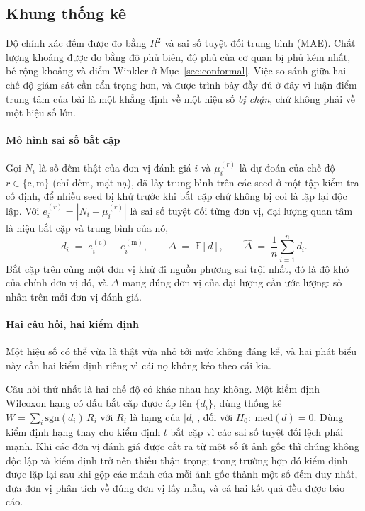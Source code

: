 \documentclass[preprint,12pt]{elsarticle}
\begin{document}
\subsection{Khung thống kê}\label{sec:stats}

Độ chính xác đếm được đo bằng $R^2$ và sai số tuyệt đối trung bình (MAE). Chất lượng khoảng được đo bằng độ phủ
biên, độ phủ của cơ quan bị phủ kém nhất, bề rộng khoảng và điểm Winkler ở Mục~\ref{sec:conformal}. Việc so sánh
giữa hai chế độ giám sát cần cẩn trọng hơn, và được trình bày đầy đủ ở đây vì luận điểm trung tâm của bài là một
khẳng định về một hiệu số \emph{bị chặn}, chứ không phải về một hiệu số lớn.

\paragraph{Mô hình sai số bắt cặp} Gọi $N_i$ là số đếm thật của đơn vị đánh giá $i$ và $\mu_i^{(r)}$ là dự đoán
của chế độ $r \in \{\mathrm{c},\mathrm{m}\}$ (chỉ-đếm, mặt nạ), đã lấy trung bình trên các seed ở một tập kiểm tra
cố định, để nhiễu seed bị khử trước khi bắt cặp chứ không bị coi là lặp lại độc lập. Với
$e_i^{(r)} = |N_i - \mu_i^{(r)}|$ là sai số tuyệt đối từng đơn vị, đại lượng quan tâm là hiệu bắt cặp và trung
bình của nó,
\begin{equation}
d_i \;=\; e_i^{(\mathrm{c})} - e_i^{(\mathrm{m})}, \qquad
\Delta \;=\; \mathbb{E}[d], \qquad
\hat{\Delta} \;=\; \frac{1}{n}\sum_{i=1}^{n} d_i .
\end{equation}
Bắt cặp trên cùng một đơn vị khử đi nguồn phương sai trội nhất, đó là độ khó của chính đơn vị đó, và $\Delta$ mang
đúng đơn vị của đại lượng cần ước lượng: số nhân trên mỗi đơn vị đánh giá.

\paragraph{Hai câu hỏi, hai kiểm định} Một hiệu số có thể vừa là thật vừa nhỏ tới mức không đáng kể, và hai phát
biểu này cần hai kiểm định riêng vì cái nọ không kéo theo cái kia.

Câu hỏi thứ nhất là hai chế độ có khác nhau hay không. Một kiểm định Wilcoxon hạng có dấu bắt cặp được áp lên
$\{d_i\}$, dùng thống kê $W = \sum_i \mathrm{sgn}(d_i)\,R_i$ với $R_i$ là hạng của $|d_i|$, đối với
$H_0:\ \mathrm{med}(d) = 0$. Dùng kiểm định hạng thay cho kiểm định $t$ bắt cặp vì các sai số tuyệt đối lệch phải
mạnh. Khi các đơn vị đánh giá được cắt ra từ một số ít ảnh gốc thì chúng không độc lập và kiểm định trở nên thiếu
thận trọng; trong trường hợp đó kiểm định được lặp lại sau khi gộp các mảnh của mỗi ảnh gốc thành một số đếm duy
nhất, đưa đơn vị phân tích về đúng đơn vị lấy mẫu, và cả hai kết quả đều được báo cáo.
\end{document}
